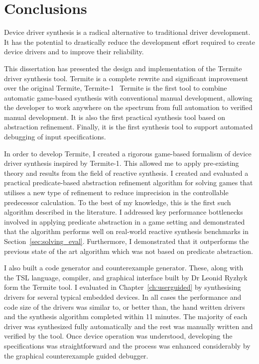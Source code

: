 \chapter{Conclusions}

Device driver synthesis is a radical alternative to traditional driver development. It has the potential to drastically reduce the development effort required to create device drivers and to improve their reliability.

This dissertation has presented the design and implementation of the Termite driver synthesis tool. Termite is a complete rewrite and significant improvement over the original Termite, Termite-1~\cite{Ryzhyk_CKSH_09} Termite is the first tool to combine automatic game-based synthesis with conventional manual development, allowing the developer to work anywhere on the spectrum from full automation to verified manual development. It is also the first practical synthesis tool based on abstraction refinement. Finally, it is the first synthesis tool to support automated debugging of input specifications. 

In order to develop Termite, I created a rigorous game-based formalism of device driver synthesis inspired by Termite-1. This allowed me to apply pre-existing theory and results from the field of reactive synthesis. I created and evaluated a practical predicate-based abstraction refinement algorithm for solving games that utilises a new type of refinement to reduce imprecision in the controllable predecessor calculation. To the best of my knowledge, this is the first such algorithm described in the literature. I addressed key performance bottlenecks involved in applying predicate abstraction in a game setting and demonstrated that the algorithm performs well on real-world reactive synthesis benchmarks in Section~\ref{sec:solving_eval}. Furthermore, I demonstrated that it outperforms the previous state of the art algorithm which was not based on predicate abstraction.

I also built a code generator and counterexample generator. These, along with the TSL language, compiler, and graphical interface built by Dr Leonid Ryzhyk form the Termite tool. I evaluated \termite in Chapter~\ref{ch:userguided} by synthesising drivers for several typical embedded devices. In all cases the performance and code size of the drivers was similar to, or better than, the hand written drivers and the synthesis algorithm completed within 11 minutes. The majority of each driver was synthesized fully automatically and the rest was manually written and verified by the tool. Once device operation was understood, developing the specifications was straightforward and the process was enhanced considerably by the graphical counterexample guided debugger.

